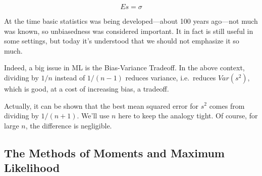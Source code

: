 \begin{equation}
Es = \sigma
\end{equation}

At the time basic statistics was being developed---about 100 years
ago---not much was known, so unbiasedness was considered important.
It in fact is still useful in some settings, but today it's understood 
that we should not emphasize it so much.

Indeed, a big issue in ML is the Bias-Variance Tradeoff.  In the above
context, dividing by $1/n$ instead of $1/(n-1)$ reduces variance, 
i.e.\ reduces $Var(s^2)$, which is good, at a cost of increasing bias, a
tradeoff.

Actually, it can be shown that the best mean squared error for $s^2$
comes from dividing by $1/(n+1)$.  We'll use $n$ here to keep the
analogy tight.  Of course, for large $n$, the difference is negligible.

\subsection{The Methods of Moments and Maximum Likelihood}
